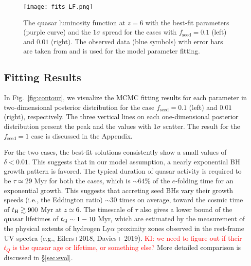 \documentclass[twocolumn, twocolappendix]{aastex63}
\newcommand{\tlife}{\tau}
\newcommand{\fseed}{f_\mathrm{seed}}
\newcommand{\red}[1]{\textcolor{red}{ #1}}
\begin{document}
\begin{CJK*}{UTF8}{gbsn}
\begin{figure*}
\centering
\texttt{[image: fits\_LF.png]}
\caption{
The quasar luminosity function at $z=6$ with the best-fit parameters (purple curve) and the $1\sigma$ spread for the cases with $\fseed=0.1$ (left) and $0.01$ (right). 
The observed data (blue symbols) with error bars are taken from  and is used for the model parameter fitting.
}
\label{fig:fitlf}
\end{figure*}



\vspace{2mm}
\subsection{Fitting Results}\label{sec:fitting_result}
In Fig.~\ref{fig:contour}, we visualize the MCMC fitting results for each parameter in two-dimensional 
posterior distribution for the case $\fseed= 0.1$ (left) and $0.01$ (right), respectively.
The three vertical lines on each one-dimensional posterior distribution present the peak and the values
with $1\sigma$ scatter.
The result for the $\fseed=1$ case is discussed in the Appendix.


For the two cases, the best-fit solutions consistently show a small values of $\delta < 0.01$.
This suggests that in our model assumption, a nearly exponential BH growth pattern is favored. 
The typical duration of quasar activity is required to be $\tlife \simeq 29$ Myr for both the cases, 
which is $\sim 64\%$ of the $e$-folding time for an exponential growth.
This suggests that accreting seed BHs vary their growth speeds (i.e., the Eddington ratio) 
$\sim 30$ times on average, toward the cosmic time of $t_{\rm H} \gtrsim 900$ Myr at $z\simeq 6$.
The timescale of $\tlife$ also gives a lower bound of the quasar lifetimes of $t_{\rm Q}\sim 1-10$ Myr, 
which are estimated by the measurement of the physical extents of hydrogen Ly$\alpha$ proximity zones 
observed in the rest-frame UV spectra (e.g., Eilers+2018, Davies+ 2019).\red{KI: we need to figure out 
if their $t_Q$ is the quasar age or lifetime, or something else?}
More detailed comparison is discussed in \S\ref{sec:evol}.



\end{CJK*}
\end{document}
